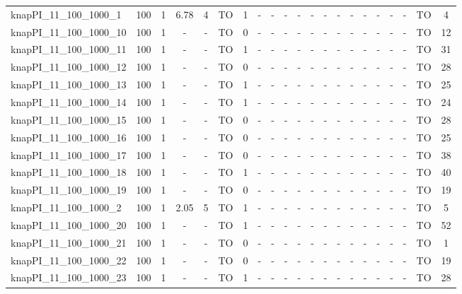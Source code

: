 \begin{sidewaystable}[!ht]
{\begin{tabular}{lcccccccccccccccccccc}
knapPI\_11\_100\_1000\_1 & 100 & 1 &  \textcolor{blue2}{6.78} & 4 & TO & 1 &  - &  - &  - &  - &  - &  - &  - &  - &  - &  - &  - &  - & TO & 4 \\
knapPI\_11\_100\_1000\_10 & 100 & 1 &  - &  - & TO & 0 &  - &  - &  - &  - &  - &  - &  - &  - &  - &  - &  - &  - & TO & 12 \\
knapPI\_11\_100\_1000\_11 & 100 & 1 &  - &  - & TO & 1 &  - &  - &  - &  - &  - &  - &  - &  - &  - &  - &  - &  - & TO & 31 \\
knapPI\_11\_100\_1000\_12 & 100 & 1 &  - &  - & TO & 0 &  - &  - &  - &  - &  - &  - &  - &  - &  - &  - &  - &  - & TO & 28 \\
knapPI\_11\_100\_1000\_13 & 100 & 1 &  - &  - & TO & 1 &  - &  - &  - &  - &  - &  - &  - &  - &  - &  - &  - &  - & TO & 25 \\
knapPI\_11\_100\_1000\_14 & 100 & 1 &  - &  - & TO & 1 &  - &  - &  - &  - &  - &  - &  - &  - &  - &  - &  - &  - & TO & 24 \\
knapPI\_11\_100\_1000\_15 & 100 & 1 &  - &  - & TO & 0 &  - &  - &  - &  - &  - &  - &  - &  - &  - &  - &  - &  - & TO & 28 \\
knapPI\_11\_100\_1000\_16 & 100 & 1 &  - &  - & TO & 0 &  - &  - &  - &  - &  - &  - &  - &  - &  - &  - &  - &  - & TO & 25 \\
knapPI\_11\_100\_1000\_17 & 100 & 1 &  - &  - & TO & 0 &  - &  - &  - &  - &  - &  - &  - &  - &  - &  - &  - &  - & TO & 38 \\
knapPI\_11\_100\_1000\_18 & 100 & 1 &  - &  - & TO & 1 &  - &  - &  - &  - &  - &  - &  - &  - &  - &  - &  - &  - & TO & 40 \\
knapPI\_11\_100\_1000\_19 & 100 & 1 &  - &  - & TO & 0 &  - &  - &  - &  - &  - &  - &  - &  - &  - &  - &  - &  - & TO & 19 \\
knapPI\_11\_100\_1000\_2 & 100 & 1 &  \textcolor{blue2}{2.05} & 5 & TO & 1 &  - &  - &  - &  - &  - &  - &  - &  - &  - &  - &  - &  - & TO & 5 \\
knapPI\_11\_100\_1000\_20 & 100 & 1 &  - &  - & TO & 1 &  - &  - &  - &  - &  - &  - &  - &  - &  - &  - &  - &  - & TO & 52 \\
knapPI\_11\_100\_1000\_21 & 100 & 1 &  - &  - & TO & 0 &  - &  - &  - &  - &  - &  - &  - &  - &  - &  - &  - &  - & TO & 1 \\
knapPI\_11\_100\_1000\_22 & 100 & 1 &  - &  - & TO & 0 &  - &  - &  - &  - &  - &  - &  - &  - &  - &  - &  - &  - & TO & 19 \\
knapPI\_11\_100\_1000\_23 & 100 & 1 &  - &  - & TO & 1 &  - &  - &  - &  - &  - &  - &  - &  - &  - &  - &  - &  - & TO & 28 \\

\end{tabular}}
\end{sidewaystable}
